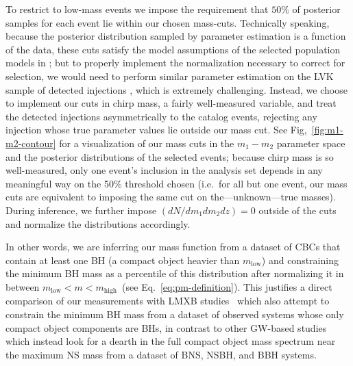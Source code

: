\documentclass[modern]{aastex631}
\newcommand{\todo}[1]{\textcolor{red}{TODO: #1}}
\begin{document}
\chreplaced[id=W]{,}{}To restrict to low-mass events we impose the requirement that $50\%$ of posterior samples
for each event lie within our chosen mass-cuts.  Technically speaking, because
the posterior distribution sampled by parameter estimation is a function of the
data, these cuts satisfy the model assumptions of the selected population models
in \citet{Mandel:2018mve}; but to properly implement the normalization necessary
to correct for selection, we would need to perform similar parameter estimation
on the LVK sample of detected injections \citep{KAGRA:2021duu}, which is
extremely challenging.  Instead, we choose to implement our cuts in chirp mass,
a fairly well-measured variable, and treat the detected injections
asymmetrically to the catalog events, rejecting any injection whose true
parameter values lie outside our mass cut.  See Fig,~\ref{fig:m1-m2-contour} for
a visualization of our mass cuts in the $m_1-m_2$ parameter space and the
posterior distributions of the selected events; because chirp mass is so
well-measured, only one event's inclusion in the analysis set depends in any
meaningful way on the 50\% threshold chosen (i.e.\ for all but one event, our
mass cuts are equivalent to imposing the same cut on the---unknown---true
masses).  During inference, we further impose
$(dN/dm_1dm_2dz)=0$ outside of the cuts and normalize the distributions
accordingly. 

In other words, we are inferring our mass function from a dataset of CBCs that
contain at least one BH (a compact object heavier than $m_\mathrm{low}$) and
constraining the minimum BH mass as a percentile of this distribution after
normalizing it in between $m_\mathrm{low}<m<m_\mathrm{high}$~(see
Eq.~\eqref{eq:pm-definition}). This justifies a direct comparison of our
measurements with LMXB studies~\citep{Bailyn:1997xt, Farr:2010tu, Ozel:2010su}
which also attempt to constrain the minimum BH mass from a dataset of observed
systems whose only compact object components are BHs,  in contrast to other GW-based studies~\citep{Farah:2021qom}
which instead look for a dearth in the full compact object mass spectrum near
the maximum NS mass from a dataset of BNS, NSBH, and BBH systems.

\end{document}
